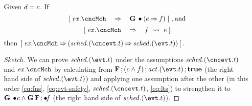 \begin{Theorem}
  \label{thm:strengthen-fns}
  Given $d = c$. If
  \begin{equation}
    \label{eq:fns}
    \ew{\execution.\cncMch \WIDE{\limp} \G \initially(\cncfsched \limp
      \fsched)}~, \textrm{and}
  \end{equation}
  \begin{equation}
    \label{eq:lts}
    \ew{\execution.\cncMch \WIDE{\limp} \fsched \wide\leadsto \cncfsched}
  \end{equation}
  then $\ew{\execution.\cncMch \limp (\schedule.(\cncevt.t) \limp \schedule.(\evt.t))}$.
\end{Theorem}
\begin{proof}[Sketch] We can prove  
  $\schedule.(\evt.t)$ under the assumptions 
  $\schedule.(\cncevt.t)$ and $\execution.\cncMch$ 
  by calculating from $\F \, ; (\csched \land \fsched) \, ; \action.(\evt.t)\, ; \ctrue$ 
  (the right hand side of $\schedule.(\evt.t)$) and applying 
  one assumption after the other (in this order \eqref{eq:fns}, 
  \eqref{eq:evt-safety}, $\schedule.(\cncevt.t)$, \eqref{eq:lts}) 
  to strengthen it to $\mathbf{G}\, \bullet\! c \land \mathbf{G}\, \mathbf{F}\,;\bullet\!f$ 
  (the right hand side of $\schedule.(\evt.t)$).
% 

\end{proof}
